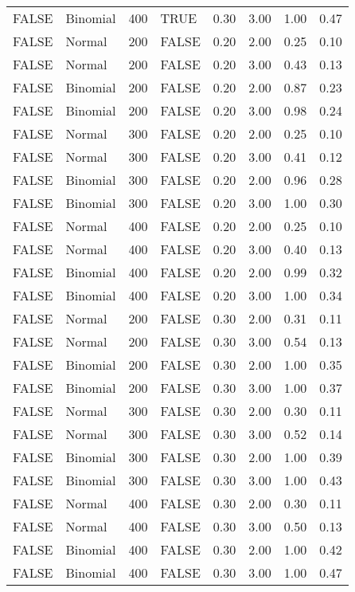 \begin{longtable}{llrlrrrr}
  FALSE & Binomial & 400 & TRUE & 0.30 & 3.00 & 1.00 & 0.47 \\ 
  FALSE & Normal & 200 & FALSE & 0.20 & 2.00 & 0.25 & 0.10 \\ 
  FALSE & Normal & 200 & FALSE & 0.20 & 3.00 & 0.43 & 0.13 \\ 
  FALSE & Binomial & 200 & FALSE & 0.20 & 2.00 & 0.87 & 0.23 \\ 
  FALSE & Binomial & 200 & FALSE & 0.20 & 3.00 & 0.98 & 0.24 \\ 
  FALSE & Normal & 300 & FALSE & 0.20 & 2.00 & 0.25 & 0.10 \\ 
  FALSE & Normal & 300 & FALSE & 0.20 & 3.00 & 0.41 & 0.12 \\ 
  FALSE & Binomial & 300 & FALSE & 0.20 & 2.00 & 0.96 & 0.28 \\ 
  FALSE & Binomial & 300 & FALSE & 0.20 & 3.00 & 1.00 & 0.30 \\ 
  FALSE & Normal & 400 & FALSE & 0.20 & 2.00 & 0.25 & 0.10 \\ 
  FALSE & Normal & 400 & FALSE & 0.20 & 3.00 & 0.40 & 0.13 \\ 
  FALSE & Binomial & 400 & FALSE & 0.20 & 2.00 & 0.99 & 0.32 \\ 
  FALSE & Binomial & 400 & FALSE & 0.20 & 3.00 & 1.00 & 0.34 \\ 
  FALSE & Normal & 200 & FALSE & 0.30 & 2.00 & 0.31 & 0.11 \\ 
  FALSE & Normal & 200 & FALSE & 0.30 & 3.00 & 0.54 & 0.13 \\ 
  FALSE & Binomial & 200 & FALSE & 0.30 & 2.00 & 1.00 & 0.35 \\ 
  FALSE & Binomial & 200 & FALSE & 0.30 & 3.00 & 1.00 & 0.37 \\ 
  FALSE & Normal & 300 & FALSE & 0.30 & 2.00 & 0.30 & 0.11 \\ 
  FALSE & Normal & 300 & FALSE & 0.30 & 3.00 & 0.52 & 0.14 \\ 
  FALSE & Binomial & 300 & FALSE & 0.30 & 2.00 & 1.00 & 0.39 \\ 
  FALSE & Binomial & 300 & FALSE & 0.30 & 3.00 & 1.00 & 0.43 \\ 
  FALSE & Normal & 400 & FALSE & 0.30 & 2.00 & 0.30 & 0.11 \\ 
  FALSE & Normal & 400 & FALSE & 0.30 & 3.00 & 0.50 & 0.13 \\ 
  FALSE & Binomial & 400 & FALSE & 0.30 & 2.00 & 1.00 & 0.42 \\ 
  FALSE & Binomial & 400 & FALSE & 0.30 & 3.00 & 1.00 & 0.47 \\ 

\end{longtable}

